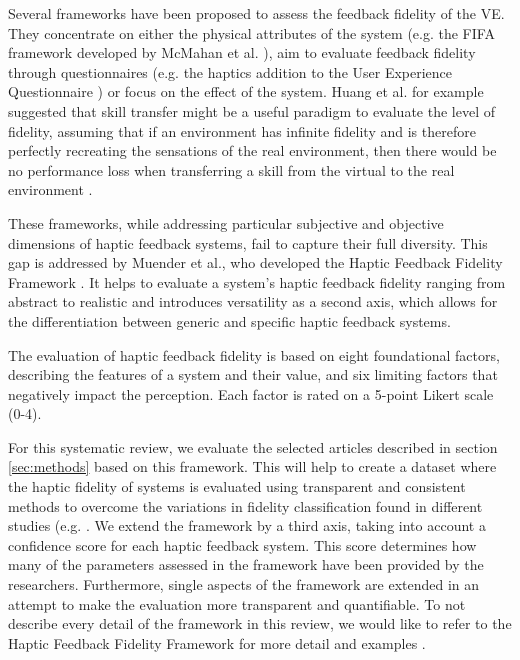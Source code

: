 Several frameworks have been proposed to assess the feedback fidelity of the VE. They concentrate on either the physical attributes of the system (e.g. the FIFA framework developed by McMahan et al. \cite{McMahan2011ExploringGames}), aim to evaluate feedback fidelity through questionnaires (e.g. the haptics addition \cite{Boos2017ErweiterungHaptik} to the User Experience Questionnaire \cite{Laugwitz2008ConstructionQuestionnaire}) or focus on the effect of the system. Huang et al. for example suggested that skill transfer might be a useful paradigm to evaluate the level of fidelity, assuming that if an environment has infinite fidelity and is therefore perfectly recreating the sensations of the real environment, then there would be no performance loss when transferring a skill from the virtual to the real environment \cite{Huang2006}.

These frameworks, while addressing particular subjective and objective dimensions of haptic feedback systems, fail to capture their full diversity. This gap is addressed by Muender et al., who developed the Haptic Feedback Fidelity Framework \cite{Muender2022HapticReality}. It helps to evaluate a system's haptic feedback fidelity ranging from abstract to realistic and introduces versatility as a second axis, which allows for the differentiation between generic and specific haptic feedback systems. 

The evaluation of haptic feedback fidelity is based on eight foundational factors, describing the features of a system and their value, and six limiting factors that negatively impact the perception. Each factor is rated on a 5-point Likert scale (0-4). 

For this systematic review, we evaluate the selected articles described in section \ref{sec:methods}  based on this framework. This will help to create a dataset where the haptic fidelity of systems is evaluated using transparent and consistent methods to overcome the variations in fidelity classification found in different studies (e.g. \cite{Yang2023, Grant2019}. We extend the framework by a third axis, taking into account a confidence score for each haptic feedback system. This score determines how many of the parameters assessed in the framework have been provided by the researchers. Furthermore, single aspects of the framework are extended in an attempt to make the evaluation more transparent and quantifiable. 
To not describe every detail of the framework in this review, we would like to refer to the Haptic Feedback Fidelity Framework for more detail and examples \cite{Muender2022HapticReality}.

